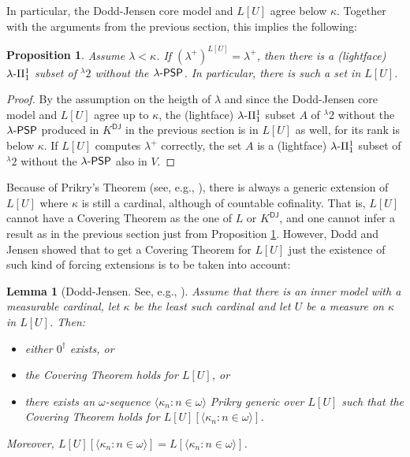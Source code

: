 \documentclass{amsart}
\numberwithin{equation}{section}
\def\hyp{{\hbox{-}}}
\newtheorem{lemma}[theorem]{Lemma}
\newtheorem{proposition}[theorem]{Proposition}
\theoremstyle{definition}
\theoremstyle{remark}
\begin{document}
In particular, the Dodd-Jensen core model and $L[U]$ agree below $\kappa$. Together with the arguments from the previous section, this implies the following:


\begin{proposition}\label{lemma:if_kappa_below_lambda_no_coanalytic_with_the_psp}
	Assume $\lambda<\kappa$. If $(\lambda^+)^{L[U]}=\lambda^+$, then there is a \emph{(lightface)} $\lambda\hyp\Pi^1_1$ subset of ${}^{\lambda}2$ without the $\lambda\hyp\mathsf{PSP}$. In particular, there is such a set in $L[U]$. 
\end{proposition}
\begin{proof}
	By the assumption on the heigth of $\lambda$ and since the Dodd-Jensen core model and $L[U]$ agree up to $\kappa$, the (lightface) $\lambda\hyp\Pi^1_1$ subset $A$ of ${}^{\lambda}2$ without the $\lambda\hyp\mathsf{PSP}$ produced in $K^{\mathsf{DJ}}$ in the previous section  is in $L[U]$ as well, for its rank is below $\kappa$. 
    If $L[U]$ computes $\lambda^+$ correctly, the set $A$  is a (lightface) $\lambda\hyp\Pi^1_1$ subset of ${}^{\lambda}2$ without the $\lambda\hyp\mathsf{PSP}$ also in $V$. 
\end{proof}

Because of Prikry's Theorem (see, e.g., \cite[Lemma 10.6]{schindler2014set}), there is always a generic extension of $L[U]$ where $\kappa$ is still a cardinal, although of countable cofinality. That is, $L[U]$ cannot have a Covering Theorem as the one of $L$ or $K^{\mathsf{DJ}}$, and one cannot infer a result as in the previous section just from Proposition \ref{lemma:if_kappa_below_lambda_no_coanalytic_with_the_psp}. However, Dodd and Jensen showed that to get a Covering Theorem for $L[U]$ just the existence of such kind of forcing extensions is to be taken into account:

\begin{lemma}[Dodd-Jensen. See, e.g., {\cite[Theorem 35.16]{Jech}}]\label{theorem:dodd-jensen-covering-theorem-for-lu} Assume that there is an inner model with a measurable cardinal, let $\kappa$ be the least such cardinal and let $U$ be a measure on $\kappa$ in $L[U]$. Then:
	\begin{itemize}
		\item[\emph{(1)}] either $0^{\dagger}$ exists, or
		\item[\emph{(2)}] the Covering Theorem holds for $L[U]$, or
		\item[\emph{(3)}] there exists an $\omega$-sequence $\langle\kappa_{n}:n\in\omega\rangle$ Prikry generic over $L[U]$ 
		such that the Covering Theorem holds for $L[U][\langle\kappa_{n}:n\in\omega\rangle]$. 
	\end{itemize}
	Moreover, $L[U][\langle \kappa_n:n\in\omega\rangle]=L[\langle\kappa_n:n\in\omega\rangle]$.
\end{lemma}
\end{document}
